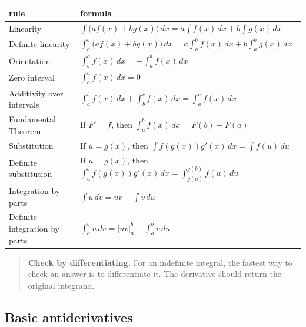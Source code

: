 \begin{center}
\renewcommand{\arraystretch}{1.9}
\begin{tabular}{p{}|p{}}
\textbf{rule} & \textbf{formula} \\ \hline

Linearity &
\(\displaystyle
\int \bigl(af(x)+bg(x)\bigr)\,dx
=
a\int f(x)\,dx+b\int g(x)\,dx
\) \\

Definite linearity &
\(\displaystyle
\int_a^b \bigl(af(x)+bg(x)\bigr)\,dx
=
a\int_a^b f(x)\,dx+b\int_a^b g(x)\,dx
\) \\

Orientation &
\(\displaystyle
\int_b^a f(x)\,dx=-\int_a^b f(x)\,dx
\) \\

Zero interval &
\(\displaystyle
\int_a^a f(x)\,dx=0
\) \\

Additivity over intervals &
\(\displaystyle
\int_a^b f(x)\,dx+\int_b^c f(x)\,dx=\int_a^c f(x)\,dx
\) \\

Fundamental Theorem &
If \(F'=f\), then
\(\displaystyle
\int_a^b f(x)\,dx=F(b)-F(a)
\) \\

Substitution &
If \(u=g(x)\), then
\(\displaystyle
\int f(g(x))g'(x)\,dx=\int f(u)\,du
\) \\

Definite substitution &
If \(u=g(x)\), then
\(\displaystyle
\int_a^b f(g(x))g'(x)\,dx
=
\int_{g(a)}^{g(b)} f(u)\,du
\) \\

Integration by parts &
\(\displaystyle
\int u\,dv=uv-\int v\,du
\) \\

Definite integration by parts &
\(\displaystyle
\int_a^b u\,dv=\bigl[uv\bigr]_a^b-\int_a^b v\,du
\)
\end{tabular}
\end{center}

\begin{quote}
\textbf{Check by differentiating.}
For an indefinite integral, the fastest way to check an answer is to differentiate it.
The derivative should return the original integrand.
\end{quote}

\subsection{Basic antiderivatives}
\label{appsubsec:basic-antiderivatives}

